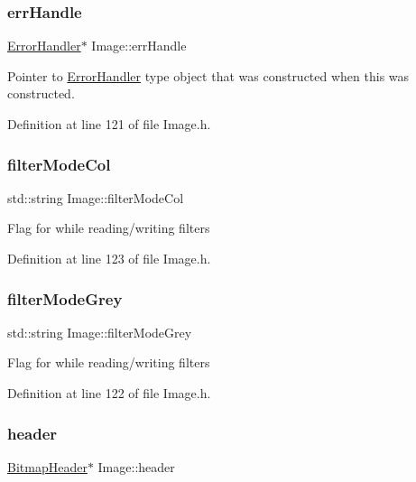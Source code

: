 \subsubsection{\texorpdfstring{errHandle}{errHandle}}
{\footnotesize\ttfamily \mbox{\hyperlink{classErrorHandler}{Error\+Handler}}$\ast$ Image\+::err\+Handle\hspace{0.3cm}{\ttfamily [private]}}

Pointer to \mbox{\hyperlink{classErrorHandler}{Error\+Handler}} type object that was constructed when this was constructed. 

Definition at line 121 of file Image.\+h.

\mbox{\label{classImage_a0b4e4d5994ff72c9f3c99913037c627f}} 
\subsubsection{\texorpdfstring{filterModeCol}{filterModeCol}}
{\footnotesize\ttfamily std\+::string Image\+::filter\+Mode\+Col\hspace{0.3cm}{\ttfamily [private]}}

Flag for while reading/writing filters 

Definition at line 123 of file Image.\+h.

\mbox{\label{classImage_aa05610d5ebee3b0fce0463d2a0b1323f}} 
\subsubsection{\texorpdfstring{filterModeGrey}{filterModeGrey}}
{\footnotesize\ttfamily std\+::string Image\+::filter\+Mode\+Grey\hspace{0.3cm}{\ttfamily [private]}}

Flag for while reading/writing filters 

Definition at line 122 of file Image.\+h.

\mbox{\label{classImage_adaf72c2df8979eafb4031dc0384dc49f}} 
\subsubsection{\texorpdfstring{header}{header}}
{\footnotesize\ttfamily \mbox{\hyperlink{classBitmapHeader}{Bitmap\+Header}}$\ast$ Image\+::header\hspace{0.3cm}{\ttfamily [private]}}

